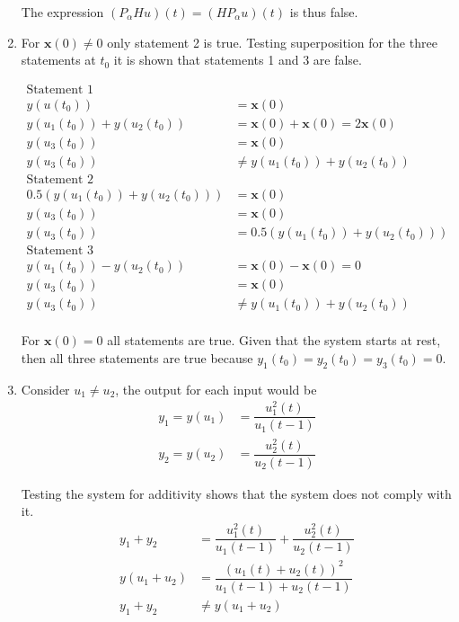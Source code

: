 \documentclass[a4paper,12pt]{article}
\begin{document}
\begin{enumerate}
The expression $(P_\alpha H u) (t) = (H P_\alpha u)(t)$ is thus false.

\item For $\mathbf x (0) \neq 0$ only statement 2 is true.
Testing superposition for the three statements at $t_0$ it is shown that statements 1 and 3 are false.

\begin{align*}
\text{Statement 1} & \\
 y(u(t_0)) &= \mathbf x(0) \\
 y(u_1(t_0)) + y(u_2(t_0)) &= \mathbf x(0)  +  \mathbf x(0) = 2 \mathbf x(0)\\
 y(u_3(t_0)) &= \mathbf x(0) \\
 y(u_3(t_0)) & \neq y(u_1(t_0)) + y(u_2(t_0))\\
 \text{Statement 2} & \\
 0.5 (y(u_1(t_0)) + y(u_2(t_0))) &= \mathbf x(0)\\
 y(u_3(t_0)) &= \mathbf x(0) \\
 y(u_3(t_0)) & = 0.5 ( y(u_1(t_0)) + y(u_2(t_0)))\\
 \text{Statement 3} & \\
 y(u_1(t_0)) - y(u_2(t_0)) &= \mathbf x(0)  -  \mathbf x(0) = 0\\
 y(u_3(t_0)) &= \mathbf x(0) \\
 y(u_3(t_0)) & \neq y(u_1(t_0)) + y(u_2(t_0))\\
\end{align*}

For $ \mathbf x (0) = 0$ all statements are true.
Given that the system starts at rest, then all three statements are true because $y_1(t_0) = y_2(t_0) = y_3(t_0) = 0$.
\item Consider $u_1 \neq u_2$, the output for each input would be
 \begin{align*}
   y_1 = y(u_1) & = \dfrac{u_1^2(t)}{u_1(t-1)}\\
   y_2 = y(u_2) & = \dfrac{u_2^2(t)}{u_2(t-1)}
 \end{align*}

Testing the system for additivity shows that the system does not comply with it.
 \begin{align*}
y_1 + y_2 &= \dfrac{u_1^2(t)}{u_1(t-1)} + \dfrac{u_2^2(t)}{u_2(t-1)}\\
y(u_1 + u_2) &= \dfrac{(u_1(t) + u_2 (t))^2}{u_1(t-1)+u_2(t-1)}\\
y_1 + y_2 & \neq y(u_1 + u_2)
 \end{align*}


\end{enumerate}
\end{document}
